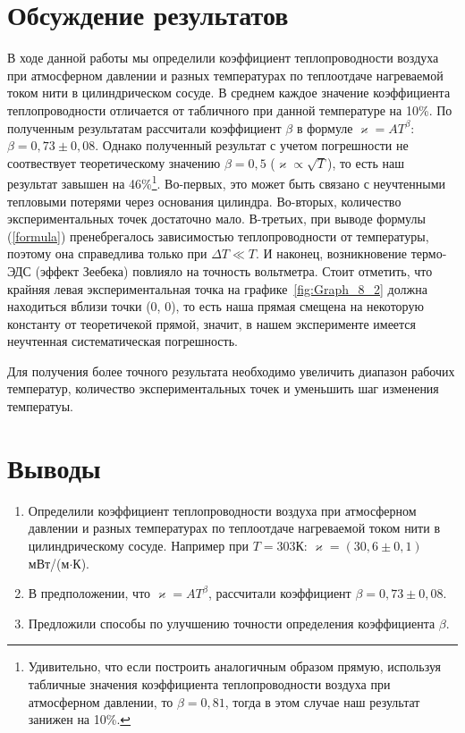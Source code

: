 \documentclass[a4paper,12pt]{article} %
\begin{document}
\section{Обсуждение результатов}
	В ходе данной работы мы определили коэффициент теплопроводности воздуха при атмосферном давлении и разных температурах по теплоотдаче нагреваемой током нити в цилиндрическом сосуде. В среднем каждое значение коэффициента теплопроводности отличается от табличного при данной температуре на 10\%. По полученным результатам рассчитали коэффициент $\beta$ в формуле $\varkappa = AT^\beta$: $\beta = 0,73 \pm 0,08$. Однако полученный результат с учетом погрешности не соотвествует теоретическому значению $\beta = 0,5$ ($\varkappa \propto \sqrt{T}$), то есть наш результат завышен на 46\%\footnote{Удивительно, что если построить аналогичным образом прямую, используя табличные значения коэффициента теплопроводности воздуха при атмосферном давлении, то $\beta = 0,81$, тогда в этом случае наш результат занижен на 10\%.}. Во-первых, это может быть связано с неучтенными тепловыми потерями через основания цилиндра. Во-вторых, количество экспериментальных точек достаточно мало. В-третьих, при выводе формулы (\ref{formula}) пренебрегалось зависимостью теплопроводности от температуры, поэтому она справедлива только при $\Delta T \ll T$. И наконец, возникновение термо-ЭДС (эффект Зеебека) повлияло на точность вольтметра. Стоит отметить, что крайняя левая экспериментальная точка на графике~\ref{fig:Graph_8_2} должна находиться вблизи точки (0, 0), то есть наша прямая смещена на некоторую константу от теоретичекой прямой, значит, в нашем эксперименте имеется неучтенная систематическая погрешность. 
	
	Для получения более точного результата необходимо увеличить диапазон рабочих температур, количество экспериментальных точек и уменьшить шаг изменения температуы.


\section{Выводы}


\begin{enumerate}
\item
	Определили коэффициент теплопроводности воздуха при атмосферном давлении и разных температурах по теплоотдаче нагреваемой током нити в цилиндрическому сосуде. Например при $T = 303$К: $\varkappa = (30,6 \pm 0,1)$ мВт/(м$\cdot$К).
	
\item
	В предположении, что $\varkappa = AT^\beta$, рассчитали коэффициент $\beta = 0,73 \pm 0,08$.
	
\item
	Предложили способы по улучшению точности определения коэффициента $\beta$.
\end{enumerate}
\end{document}
